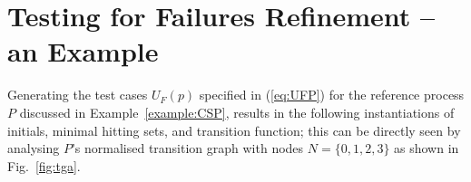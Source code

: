 \section{Testing for Failures Refinement -- an Example}
\label{sec:case}

%

Generating the test cases $U_F(p)$ specified in  (\ref{eq:UFP}) for the reference
process $P$ discussed in Example~\ref{example:CSP},
results in the following instantiations of initials, minimal hitting sets, and
transition function; this can be directly seen by analysing $P$'s normalised
transition graph with nodes $N =\{0,1,2,3\}$ as shown in Fig.~\ref{fig:tga}.

